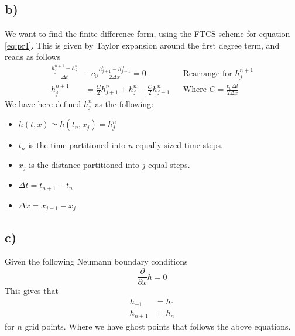 \documentclass[10pt, a4paper]{amsart}
\begin{document}
\subsection{b)}
We want to find the finite difference form, using the FTCS scheme for equation \ref{eq:pr1}. 
This is given by Taylor expansion around the first degree term, and reads as follows 
\begin{align}\label{1FTCS}
	\frac{h_j^{n+1} - h_j^n}{\Delta t} &- c_0 \frac{h_{j+1}^n - h_{j-1}^n}{2\Delta x} = 0 && \text{Rearrange for $h_j^{n+1}$}\\
	h_j^{n+1} &= \frac{C}{2}h_{j+1}^n + h_j^n - \frac{C}{2}h_{j-1}^n && \text{Where $C = \frac{c_0\Delta t}{2\Delta x}$}
\end{align}
We have here defined $h_j^n$ as the following:
\begin{itemize}
	\item $h(t,x) \simeq h(t_n, x_j) = h_j^n$ 
	\item $t_n$ is the time partitioned into $n$ equally sized time steps. 
	\item $x_j$ is the distance partitioned into $j$ equal steps. 
	\item $\Delta t = t_{n+1} - t_n$ 
	\item $\Delta x = x_{j+1} - x_j$
\end{itemize} 
\subsection{c)}
Given the following Neumann boundary conditions 
\begin{equation}
	\frac{\partial }{\partial x}h = 0
\end{equation}
This gives that 
\begin{align}
	h_{-1} &= h_0 \\
	h_{n+1} &= h_{n}
\end{align}
for $n$ grid points. Where we have ghost points that follows the above equations. 
\end{document}
